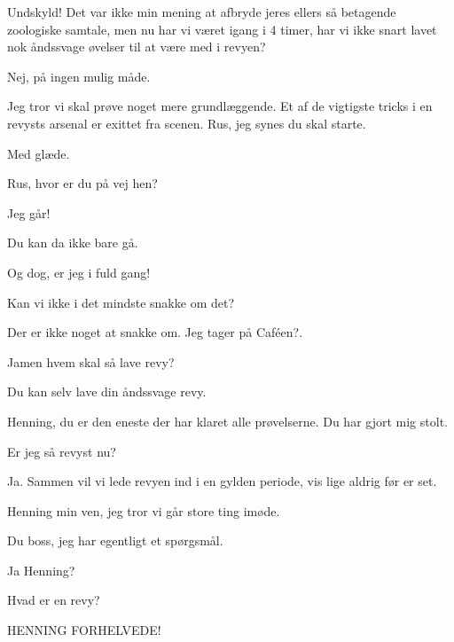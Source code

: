 \documentclass[a4paper,11pt]{article}
\begin{document}
\begin{sketch}
 Undskyld! Det var ikke min mening at afbryde jeres ellers så betagende zoologiske samtale, men nu har vi været igang i 4 timer, har vi ikke snart lavet nok åndssvage øvelser til at være med i revyen?

 Nej, på ingen mulig måde.


 Jeg tror vi skal prøve noget mere grundlæggende. Et af de vigtigste tricks i en revysts arsenal er exittet fra scenen. Rus, jeg synes du skal starte.

 Med glæde.


 Rus, hvor er du på vej hen?

 Jeg går!

 Du kan da ikke bare gå.

 Og dog, er jeg i fuld gang!

 Kan vi ikke i det mindste snakke om det?

 Der er ikke noget at snakke om. Jeg tager på Caféen?.

 Jamen hvem skal så lave revy?

 Du kan selv lave din åndssvage revy.


 Henning, du er den eneste der har klaret alle prøvelserne. Du har gjort mig stolt.

 Er jeg så revyst nu?

 Ja. Sammen vil vi lede revyen ind i en gylden periode, vis lige aldrig før er set.


 Henning min ven, jeg tror vi går store ting imøde.

 Du boss, jeg har egentligt et spørgsmål.

 Ja Henning?

 Hvad er en revy?

 HENNING FORHELVEDE!

\end{sketch}
\end{document}
